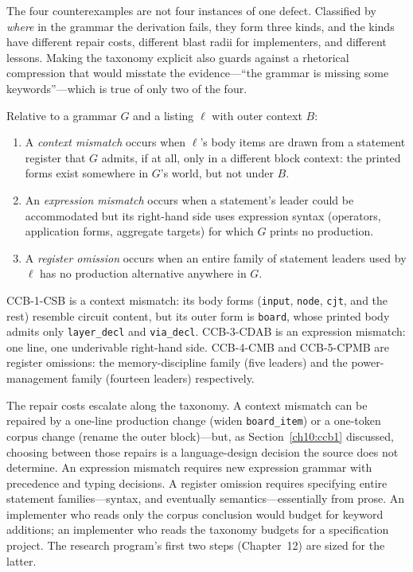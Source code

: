 The four counterexamples are not four instances of one defect. Classified by \emph{where} in the grammar the derivation fails, they form three kinds, and the kinds have different repair costs, different blast radii for implementers, and different lessons. Making the taxonomy explicit also guards against a rhetorical compression that would misstate the evidence---``the grammar is missing some keywords''---which is true of only two of the four.

\begin{definition}\label{ch10:def-kinds}
Relative to a grammar $G$ and a listing $\ell$ with outer context $B$:
\begin{enumerate}
\item A \emph{context mismatch} occurs when $\ell$'s body items are drawn from a statement register that $G$ admits, if at all, only in a different block context: the printed forms exist somewhere in $G$'s world, but not under $B$.
\item An \emph{expression mismatch} occurs when a statement's leader could be accommodated but its right-hand side uses expression syntax (operators, application forms, aggregate targets) for which $G$ prints no production.
\item A \emph{register omission} occurs when an entire family of statement leaders used by $\ell$ has no production alternative anywhere in $G$.
\end{enumerate}
\end{definition}

CCB-1-CSB is a context mismatch: its body forms (\texttt{input}, \texttt{node}, \texttt{cjt}, and the rest) resemble circuit content, but its outer form is \texttt{board}, whose printed body admits only \texttt{layer\_decl} and \texttt{via\_decl}. CCB-3-CDAB is an expression mismatch: one line, one underivable right-hand side. CCB-4-CMB and CCB-5-CPMB are register omissions: the memory-discipline family (five leaders) and the power-management family (fourteen leaders) respectively.

The repair costs escalate along the taxonomy. A context mismatch can be repaired by a one-line production change (widen \texttt{board\_item}) or a one-token corpus change (rename the outer block)---but, as Section~\ref{ch10:ccb1} discussed, choosing between those repairs is a language-design decision the source does not determine. An expression mismatch requires new expression grammar with precedence and typing decisions. A register omission requires specifying entire statement families---syntax, and eventually semantics---essentially from prose. An implementer who reads only the corpus conclusion would budget for keyword additions; an implementer who reads the taxonomy budgets for a specification project. The research program's first two steps (Chapter~12) are sized for the latter.


